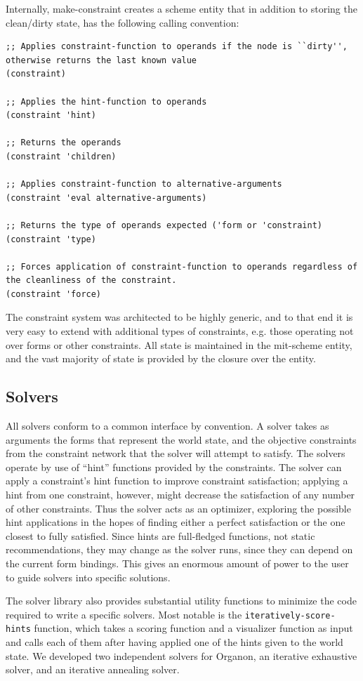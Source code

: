 \documentclass[12pt,a4paper]{article}
\begin{document}
Internally, make-constraint creates a scheme entity that in addition to storing the clean/dirty state, has the following calling convention:
\begin{lstlisting}
;; Applies constraint-function to operands if the node is ``dirty'', otherwise returns the last known value
(constraint)

;; Applies the hint-function to operands
(constraint 'hint)

;; Returns the operands
(constraint 'children)

;; Applies constraint-function to alternative-arguments
(constraint 'eval alternative-arguments)

;; Returns the type of operands expected ('form or 'constraint)
(constraint 'type) 

;; Forces application of constraint-function to operands regardless of the cleanliness of the constraint.
(constraint 'force)

\end{lstlisting}
The constraint system was architected to be highly generic, and to that end it is very easy to extend with additional types of constraints, e.g. those operating not over forms or other constraints.   All state is maintained in the mit-scheme entity, and the vast majority of state is provided by the closure over the entity.

\subsection{Solvers}

All solvers conform to a common interface by convention. A solver takes as arguments the forms that represent the world state, and the objective constraints from the constraint network that the solver will attempt to satisfy. The solvers operate by use of ``hint'' functions provided by the constraints. The solver can apply a constraint's hint function to improve constraint satisfaction; applying a hint from one constraint, however, might decrease the satisfaction of any number of other constraints. Thus the solver acts as an optimizer, exploring the possible hint applications in the hopes of finding either a perfect satisfaction or the one closest to fully satisfied. Since hints are full-fledged functions, not static recommendations, they may change as the solver runs, since they can depend on the current form bindings. This gives an enormous amount of power to the user to guide solvers into specific solutions.

The solver library also provides substantial utility functions to minimize the code required to write a specific solvers. Most notable is the \texttt{iteratively-score-hints} function, which takes a scoring function and a visualizer function as input and calls each of them after having applied one of the hints given to the world state. We developed two independent solvers for Organon, an iterative exhaustive solver, and an iterative annealing solver.
\end{document}
